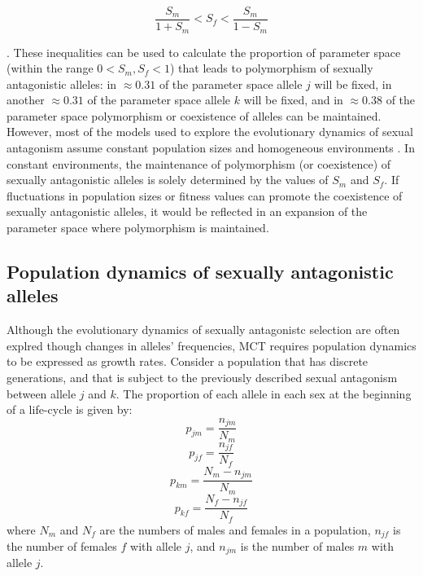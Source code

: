 \documentclass[]{article}
\begin{document}
 \begin{equation}
\frac{S_{m}}{1+S_{m}} < S_{f} < \frac{S_{m}}{1-S_{m}}
\label{selection}
 \end{equation}

\citep{kidwell1977regions,pamilo1979genic,connallon_evolutionary_2018}. These inequalities can be used to calculate the proportion of parameter space (within the range $ 0 < S_{m}, S_{f} < 1$) that leads to polymorphism of sexually antagonistic alleles: in $\approx 0.31$ of the parameter space allele $j$ will be fixed, in another $\approx 0.31$ of the parameter space allele $k$ will be fixed, and in $\approx 0.38$ of the parameter space polymorphism or coexistence of alleles can be maintained. However, most of the models used to explore the evolutionary dynamics of sexual antagonism assume constant population sizes and homogeneous environments \citep{kidwell1977regions,pamilo1979genic}. In constant environments, the maintenance of polymorphism (or coexistence) of sexually antagonistic alleles is solely determined by the values of $S_{m}$ and $S_{f}$. If fluctuations in population sizes or fitness values can promote the coexistence of sexually antagonistic alleles, it would be reflected in an expansion of the parameter space where polymorphism is maintained.


\subsection*{Population dynamics of sexually antagonistic alleles}

Although the evolutionary dynamics of sexually antagonistc selection are often explred though changes in alleles' frequencies, MCT requires population dynamics to be expressed as growth rates. Consider a population that has discrete generations, and that is subject to the previously described sexual antagonism between allele $j$ and $k$. The proportion of each allele in each sex at the beginning of a life-cycle is given by:
\begin{equation}
    p_{jm}= \frac{n_{jm}}{N_{m}}
    \label{first_pop}
\end{equation}
\begin{equation}
    p_{jf}= \frac{n_{jf}}{N_{f}}
\end{equation}
\begin{equation}
    p_{km}= \frac{N_{m}-n_{jm}}{N_{m}}
\end{equation}
\begin{equation}
    p_{kf}= \frac{N_{f}-n_{jf}}{N_{f}}
\end{equation}
where $N_m$ and $N_f$ are the numbers of males and females in a population, $n_{jf}$ is the number of females $f$ with allele $j$, and $n_{jm}$ is the number of males $m$ with allele $j$.
\end{document}
